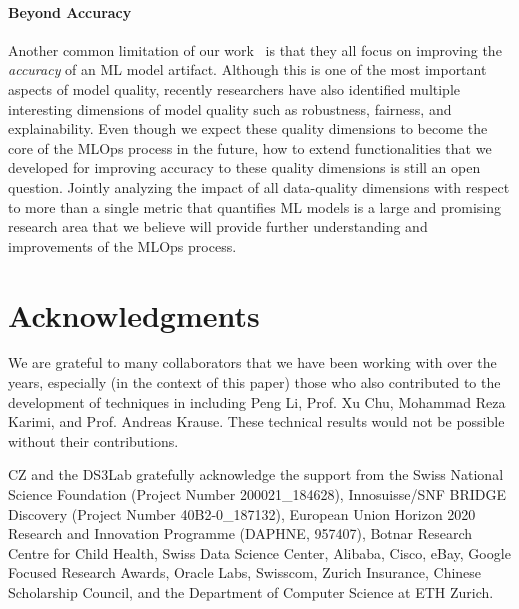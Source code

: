 \documentclass[11pt]{article}
\begin{document}
\paragraph{Beyond Accuracy}
Another common limitation of our work~\cite{karlavs2020nearest, renggli2020automatic, karimi2020online, renggli2019continuous}
is that they all focus on improving the \textit{accuracy} of an ML model artifact. Although this is one of the most important 
aspects of model quality, recently researchers have
also identified multiple interesting dimensions
of model quality such as robustness, fairness,
and explainability. 
Even though we expect these quality dimensions to
become the core of the MLOps process in the future,
how to extend functionalities that we 
developed for improving accuracy to 
these quality dimensions is still an open question.
Jointly analyzing the impact of all data-quality dimensions with respect to more than a single metric that quantifies ML models is a large and promising research area that we believe will provide further understanding and improvements of the MLOps process.


\section*{Acknowledgments}
\small
We are grateful to many collaborators that we have 
been working with over the years, especially (in the context of this paper) those
who also contributed to the development of techniques in \cite{karlavs2020nearest, renggli2020automatic, karimi2020online, renggli2019continuous} including Peng Li, Prof. Xu Chu, Mohammad Reza Karimi, and Prof. Andreas Krause. These technical results would not be possible without their contributions.

CZ and the DS3Lab gratefully acknowledge the support from the Swiss National Science Foundation (Project Number 200021\_184628), Innosuisse/SNF BRIDGE Discovery (Project Number 40B2-0\_187132), European Union Horizon 2020 Research and Innovation Programme (DAPHNE, 957407), Botnar Research Centre for Child Health, Swiss Data Science Center, Alibaba, Cisco, eBay, Google Focused Research Awards, Oracle Labs, Swisscom, Zurich Insurance, Chinese Scholarship Council, and the Department of Computer Science at ETH Zurich.

\newpage


\end{document}

